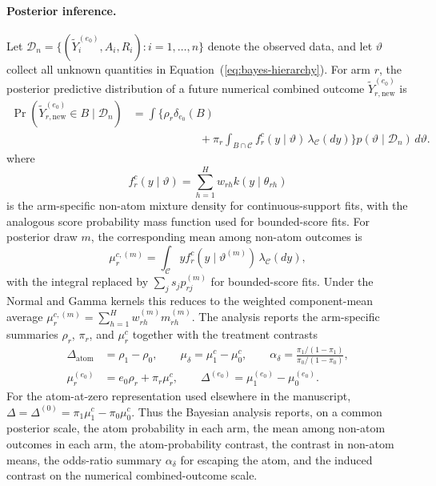 \documentclass[11pt]{article}
\begin{document}
\paragraph{Posterior inference.}
Let $\mathcal{D}_n = \{(\widetilde{Y}_i^{(e_0)},A_i,R_i):i=1,\ldots,n\}$ denote the observed data, and let $\vartheta$ collect all unknown quantities in Equation~(\ref{eq:bayes-hierarchy}). For arm $r$, the posterior predictive distribution of a future numerical combined outcome $\widetilde{Y}_{r,\mathrm{new}}^{(e_0)}$ is
\begin{align*}
  \Pr\!\left(\widetilde{Y}_{r,\mathrm{new}}^{(e_0)} \in B \mid \mathcal{D}_n\right)
  &=
  \int
  \Biggl\{
    \rho_r \delta_{e_0}(B) \\
  &\qquad\qquad\qquad
    + \pi_r \int_{B \cap \mathcal{C}} f_r^c(y \mid \vartheta)\,\lambda_{\mathcal{C}}(dy)
  \Biggr\}
  p(\vartheta \mid \mathcal{D}_n)\,d\vartheta.
\end{align*}
where
\[
  f_r^c(y \mid \vartheta)
  = \sum_{h=1}^{H} w_{rh} k(y \mid \theta_{rh})
\]
is the arm-specific non-atom mixture density for continuous-support fits, with the analogous score probability mass function used for bounded-score fits. For posterior draw $m$, the corresponding mean among non-atom outcomes is
\[
  \mu_r^{c,(m)}
  = \int_{\mathcal{C}} y f_r^c(y \mid \vartheta^{(m)})\,\lambda_{\mathcal{C}}(dy),
\]
with the integral replaced by $\sum_j s_j p_{rj}^{(m)}$ for bounded-score fits. Under the Normal and Gamma kernels this reduces to the weighted component-mean average $\mu_r^{c,(m)} = \sum_{h=1}^{H} w_{rh}^{(m)} m_{rh}^{(m)}$. The analysis reports the arm-specific summaries $\rho_r$, $\pi_r$, and $\mu_r^c$ together with the treatment contrasts
\begin{align}
  \Delta_{\mathrm{atom}}
  &= \rho_1 - \rho_0,
  \qquad
  \mu_{\delta}
  = \mu_1^c - \mu_0^c,
  \qquad
  \alpha_{\delta}
  = \frac{\pi_1/(1-\pi_1)}{\pi_0/(1-\pi_0)},
  \nonumber\\
  \mu_r^{(e_0)}
  &= e_0\rho_r + \pi_r\mu_r^c,
  \qquad
  \Delta^{(e_0)}
  = \mu_1^{(e_0)} - \mu_0^{(e_0)}.
  \label{eq:bayes-estimands}
\end{align}
For the atom-at-zero representation used elsewhere in the manuscript, $\Delta = \Delta^{(0)} = \pi_1\mu_1^c - \pi_0\mu_0^c$. Thus the Bayesian analysis reports, on a common posterior scale, the atom probability in each arm, the mean among non-atom outcomes in each arm, the atom-probability contrast, the contrast in non-atom means, the odds-ratio summary $\alpha_{\delta}$ for escaping the atom, and the induced contrast on the numerical combined-outcome scale.
\end{document}
